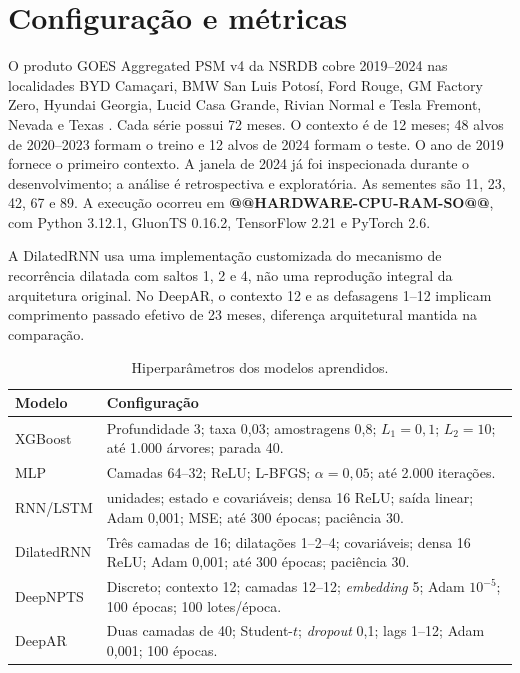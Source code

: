 \documentclass[12pt,a4paper,fleqn]{article}
\begin{document}
\section{Configuração e métricas}
\label{sec:configuracao}

O produto GOES Aggregated PSM v4 da NSRDB cobre 2019--2024 nas localidades BYD Camaçari, BMW San Luis Potosí, Ford Rouge, GM Factory Zero, Hyundai Georgia, Lucid Casa Grande, Rivian Normal e Tesla Fremont, Nevada e Texas \citep{nlr2026}. Cada série possui 72 meses. O contexto é de 12 meses; 48 alvos de 2020--2023 formam o treino e 12 alvos de 2024 formam o teste. O ano de 2019 fornece o primeiro contexto. A janela de 2024 já foi inspecionada durante o desenvolvimento; a análise é retrospectiva e exploratória. As sementes são 11, 23, 42, 67 e 89. A execução ocorreu em \textbf{@@HARDWARE-CPU-RAM-SO@@}, com Python 3.12.1, GluonTS 0.16.2, TensorFlow 2.21 e PyTorch 2.6.

A DilatedRNN usa uma implementação customizada do mecanismo de recorrência dilatada com saltos 1, 2 e 4, não uma reprodução integral da arquitetura original. No DeepAR, o contexto 12 e as defasagens 1--12 implicam comprimento passado efetivo de 23 meses, diferença arquitetural mantida na comparação.

\begin{table}[!ht]
\centering
\caption{Hiperparâmetros dos modelos aprendidos.}
\label{tab:hiper}
\renewcommand{\arraystretch}{1.02}
\setlength{\tabcolsep}{3pt}
\begin{tabular}{>{\raggedright\arraybackslash}p{2.2cm}>{\raggedright\arraybackslash}p{12.1cm}}
\toprule
\textbf{Modelo} & \textbf{Configuração} \\
\midrule
XGBoost & Profundidade 3; taxa 0,03; amostragens 0,8; $L_1=0,1$; $L_2=10$; até 1.000 árvores; parada 40. \\
MLP & Camadas 64--32; ReLU; L-BFGS; $\alpha=0,05$; até 2.000 iterações. \\
RNN/LSTM & 16 unidades; estado e covariáveis; densa 16 ReLU; saída linear; Adam 0,001; MSE; até 300 épocas; paciência 30. \\
DilatedRNN & Três camadas de 16; dilatações 1--2--4; covariáveis; densa 16 ReLU; Adam 0,001; até 300 épocas; paciência 30. \\
DeepNPTS & Discreto; contexto 12; camadas 12--12; \textit{embedding} 5; Adam $10^{-5}$; 100 épocas; 100 lotes/época. \\
DeepAR & Duas camadas de 40; Student-$t$; \textit{dropout} 0,1; lags 1--12; Adam 0,001; 100 épocas. \\
\bottomrule
\end{tabular}
\end{table}
\end{document}
